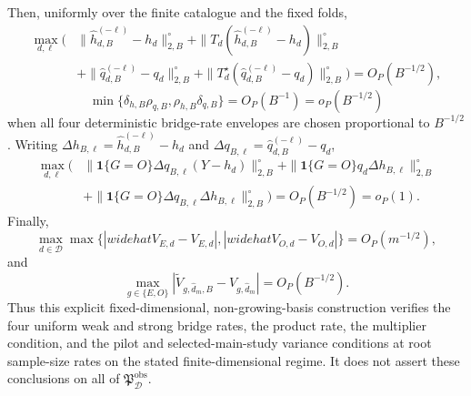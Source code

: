 Then, uniformly over the finite catalogue and the fixed folds,
\[
\begin{aligned}
 \max_{d,\ell}\bigl(&
 \|\widehat h_{d,B}^{(-\ell)}-h_d\|_{2,B}^{\circ}
 +\|T_d(\widehat h_{d,B}^{(-\ell)}-h_d)\|_{2,B}^{\circ}\\
 &+\|\widehat q_{d,B}^{(-\ell)}-q_d\|_{2,B}^{\circ}
 +\|T_d^\star(\widehat q_{d,B}^{(-\ell)}-q_d)\|_{2,B}^{\circ}
 \bigr)=O_P(B^{-1/2}),                                     \tag{6}
\end{aligned}
\]
\[
 \min\{\delta_{h,B}\rho_{q,B},\rho_{h,B}\delta_{q,B}\}
 =O_P(B^{-1})=o_P(B^{-1/2})                                \tag{7}
\]
when all four deterministic bridge-rate envelopes are chosen proportional to \(B^{-1/2}\).  Writing \(\Delta h_{B,\ell}=\widehat h_{d,B}^{(-\ell)}-h_d\) and \(\Delta q_{B,\ell}=\widehat q_{d,B}^{(-\ell)}-q_d\),
\[
\begin{aligned}
\max_{d,\ell}\bigl(&
\|\mathbf1\{G=O\}\Delta q_{B,\ell}(Y-h_d)\|_{2,B}^{\circ}
+\|\mathbf1\{G=O\}q_d\Delta h_{B,\ell}\|_{2,B}^{\circ}\\
&+\|\mathbf1\{G=O\}\Delta q_{B,\ell}\Delta h_{B,\ell}\|_{2,B}^{\circ}
\bigr)=O_P(B^{-1/2})=o_P(1).                               \tag{8}
\end{aligned}
\]
Finally,
\[
 \max_{d\in\mathcal D}\max\{|widehat V_{E,d}-V_{E,d}|,
 |widehat V_{O,d}-V_{O,d}|\}=O_P(m^{-1/2}),               \tag{9}
\]
and
\[
 \max_{g\in\{E,O\}}
 |\widetilde V_{g,\widehat d_m,B}-V_{g,\widehat d_m}|
 =O_P(B^{-1/2}).                                           \tag{10}
\]
Thus this explicit fixed-dimensional, non-growing-basis construction verifies the four uniform weak and strong bridge rates, the product rate, the multiplier condition, and the pilot and selected-main-study variance conditions at root sample-size rates on the stated finite-dimensional regime.  It does not assert these conclusions on all of \(\mathfrak P_{\mathcal D}^{\mathrm{obs}}\).